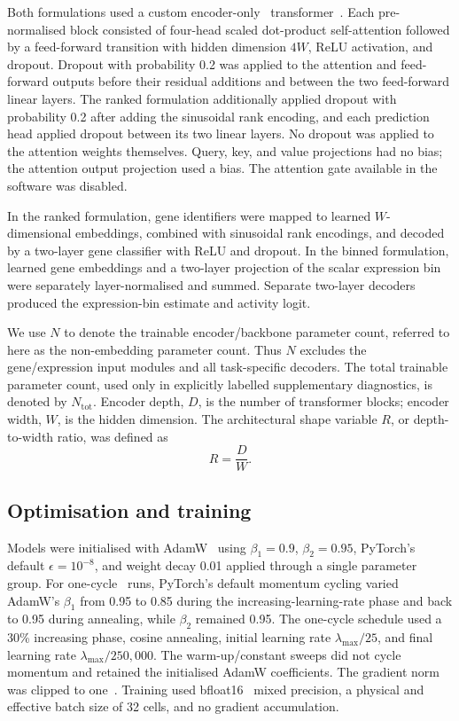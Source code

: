 \documentclass[pdflatex,sn-nature]{sn-jnl}%
\theoremstyle{thmstyleone}%
\theoremstyle{thmstyletwo}%
\theoremstyle{thmstylethree}%
\begin{document}
Both formulations used a custom encoder-only~\cite{devlin-etal-2019-bert} transformer~\cite{Vaswani2017}.
Each pre-normalised block consisted of four-head scaled dot-product self-attention followed by a feed-forward transition with hidden dimension \(4W\), ReLU activation, and dropout.
Dropout with probability 0.2 was applied to the attention and feed-forward outputs before their residual additions and between the two feed-forward linear layers.
The ranked formulation additionally applied dropout with probability 0.2 after adding the sinusoidal rank encoding, and each prediction head applied dropout between its two linear layers.
No dropout was applied to the attention weights themselves.
Query, key, and value projections had no bias; the attention output projection used a bias.
The attention gate available in the software was disabled.

In the ranked formulation, gene identifiers were mapped to learned \(W\)-dimensional embeddings, combined with sinusoidal rank encodings, and decoded by a two-layer gene classifier with ReLU and dropout.
In the binned formulation, learned gene embeddings and a two-layer projection of the scalar expression bin were separately layer-normalised and summed.
Separate two-layer decoders produced the expression-bin estimate and activity logit.

We use \(N\) to denote the trainable encoder/backbone parameter count, referred to here as the non-embedding parameter count.
Thus \(N\) excludes the gene/expression input modules and all task-specific decoders.
The total trainable parameter count, used only in explicitly labelled supplementary diagnostics, is denoted by \(N_{\mathrm{tot}}\).
Encoder depth, \(D\), is the number of transformer blocks; encoder width, \(W\), is the hidden dimension.
The architectural shape variable \(R\), or depth-to-width ratio, was defined as
\begin{equation}
    R = \frac{D}{W}.
\end{equation}

\subsection{Optimisation and training}

Models were initialised with AdamW~\cite{loshchilov2018decoupled} using \(\beta_1=0.9\), \(\beta_2=0.95\), PyTorch's default \(\epsilon=10^{-8}\), and weight decay 0.01 applied through a single parameter group.
For one-cycle~\cite{smith2018superconvergencefasttrainingneural} runs, PyTorch's default momentum cycling varied AdamW's \(\beta_1\) from 0.95 to 0.85 during the increasing-learning-rate phase and back to 0.95 during annealing, while \(\beta_2\) remained 0.95.
The one-cycle schedule used a 30\% increasing phase, cosine annealing, initial learning rate \(\lambda_{\max}/25\), and final learning rate \(\lambda_{\max}/250{,}000\).
The warm-up/constant sweeps did not cycle momentum and retained the initialised AdamW coefficients.
The gradient norm was clipped to one~\cite{Pascanu2013}.
Training used bfloat16~\cite{kalamkar2019studybfloat16deeplearning} mixed precision, a physical and effective batch size of 32 cells, and no gradient accumulation.
\end{document}
